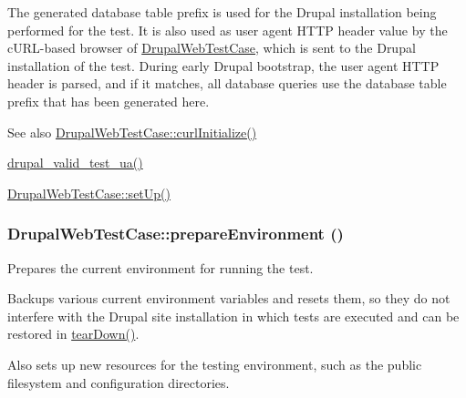 The generated database table prefix is used for the Drupal installation being performed for the test. It is also used as user agent HTTP header value by the cURL-\/based browser of \hyperlink{classDrupalWebTestCase}{DrupalWebTestCase}, which is sent to the Drupal installation of the test. During early Drupal bootstrap, the user agent HTTP header is parsed, and if it matches, all database queries use the database table prefix that has been generated here.

\begin{DoxySeeAlso}{See also}
\hyperlink{classDrupalWebTestCase_a8c51d47f5b89aad9f5e7fc4fa001bf05}{DrupalWebTestCase::curlInitialize()} 

\hyperlink{bootstrap_8inc_abdfb3ad2d4e0a21b9319296b2f4e25e2}{drupal\_\-valid\_\-test\_\-ua()} 

\hyperlink{classDrupalWebTestCase_a110ecf5deb57ee6a908617360c1f6ec4}{DrupalWebTestCase::setUp()} 
\end{DoxySeeAlso}
\hypertarget{classDrupalWebTestCase_aafa7fa69ee28fd661c23edbc4f6766ac}{
\subsubsection[{prepareEnvironment}]{\setlength{\rightskip}{0pt plus 5cm}DrupalWebTestCase::prepareEnvironment ()}}
\label{classDrupalWebTestCase_aafa7fa69ee28fd661c23edbc4f6766ac}
Prepares the current environment for running the test.

Backups various current environment variables and resets them, so they do not interfere with the Drupal site installation in which tests are executed and can be restored in \hyperlink{classDrupalWebTestCase_a6c0dba3c89c4aab3fa2576857c6f2be1}{tearDown()}.

Also sets up new resources for the testing environment, such as the public filesystem and configuration directories.


